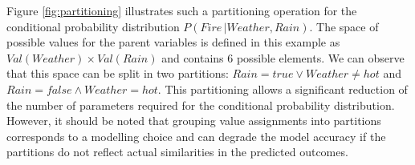 
Figure \ref{fig:partitioning} illustrates such a partitioning operation for the conditional probability distribution $P(\mathit{Fire} \, | \mathit{Weather}, \mathit{Rain})$.  The space of possible values for the parent variables is defined in this example as $\mathit{Val}(\mathit{Weather}) \times \mathit{Val}(\mathit{Rain})$ and contains 6 possible elements.  We can observe that this space can be split in two partitions: $\mathit{Rain}\!=\mathit{true} \lor \mathit{Weather}\!\neq\mathit{hot}$ and $\mathit{Rain}\!=\mathit{false} \land \mathit{Weather}\!=\mathit{hot}$. This partitioning allows a significant reduction of the number of parameters required for the conditional probability distribution.  However, it should be noted that grouping value assignments into partitions corresponds to a modelling choice and can degrade the model accuracy if the partitions do not reflect actual similarities in the predicted outcomes.



